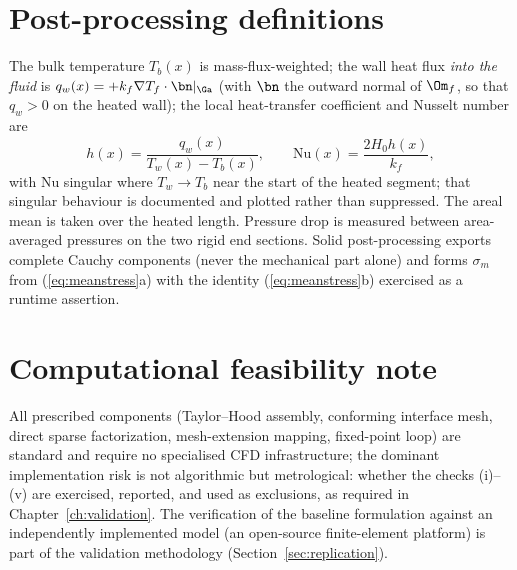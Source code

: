 \section{Post-processing definitions}
The bulk temperature $T_b(x)$ is mass-flux-weighted; the wall heat flux \emph{into the fluid} is
$q_w(x)=+k_f\nabla T_f\cdot\bn|_\Ga$ (with $\bn$ the outward normal of $\Om_f$, so that $q_w>0$ on
the heated wall); the local heat-transfer coefficient and Nusselt number are
\begin{equation}
h(x)=\frac{q_w(x)}{T_w(x)-T_b(x)},\qquad \mathrm{Nu}(x)=\frac{2H_0h(x)}{k_f},
\end{equation}
with $\mathrm{Nu}$ singular where $T_w\to T_b$ near the start of the heated segment; that singular
behaviour is documented and plotted rather than suppressed. The areal mean is taken over the heated
length. Pressure drop is measured between area-averaged pressures on the two rigid end sections.
Solid post-processing exports complete Cauchy components (never the mechanical part alone) and
forms $\sigma_m$ from (\ref{eq:meanstress}a) with the identity (\ref{eq:meanstress}b) exercised as
a runtime assertion.

\section{Computational feasibility note}
All prescribed components (Taylor--Hood assembly, conforming interface mesh, direct sparse
factorization, mesh-extension mapping, fixed-point loop) are standard and require no specialised
CFD infrastructure; the dominant implementation risk is not algorithmic but metrological: whether
the checks (i)--(v) are exercised, reported, and used as exclusions, as required in
Chapter~\ref{ch:validation}. The verification of the baseline formulation against an independently
implemented model (an open-source finite-element platform) is part of the validation methodology
(Section~\ref{sec:replication}).

